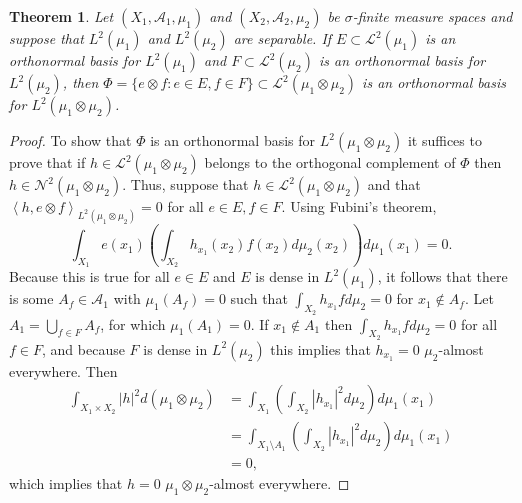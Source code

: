 \documentclass{article}
\newcommand{\inner}[2]{\left\langle #1, #2 \right\rangle}
\newtheorem{theorem}{Theorem}
\theoremstyle{definition}
\begin{document}
\begin{theorem}
Let  $(X_1,\mathscr{A}_1,\mu_1)$ and $(X_2,\mathscr{A}_2,\mu_2)$ be
$\sigma$-finite measure spaces and suppose that
$L^2(\mu_1)$ and $L^2(\mu_2)$ are separable. If
$E \subset \mathscr{L}^2(\mu_1)$ is an orthonormal basis for $L^2(\mu_1)$ and $F \subset \mathscr{L}^2(\mu_2)$ is an orthonormal basis for $L^2(\mu_2)$,
then  $\Phi=\{e \otimes f: e \in E, f \in F\} \subset \mathscr{L}^2(\mu_1 \otimes \mu_2)$ is an orthonormal basis for $L^2(\mu_1 \otimes \mu_2)$. 
\end{theorem}
\begin{proof}
To show that $\Phi$ is an orthonormal basis for $L^2(\mu_1 \otimes \mu_2)$ it suffices to prove that if
$h \in \mathscr{L}^2(\mu_1 \otimes \mu_2)$ belongs to the orthogonal  complement  of $\Phi$ then
$h \in \mathscr{N}^2(\mu_1 \otimes \mu_2)$. 
Thus, suppose that $h \in \mathscr{L}^2(\mu_1 \otimes \mu_2)$ and that 
$\inner{h}{e \otimes f}_{L^2(\mu_1 \otimes \mu_2)}=0$ for all $e \in E, f \in F$. Using Fubini's theorem,
\[
\int_{X_1} e(x_1) \left( \int_{X_2} h_{x_1}(x_2)  f(x_2) d\mu_2(x_2) \right) d\mu_1(x_1)=0.
\]
Because this is true for all $e \in E$ and $E$ is dense in $L^2(\mu_1)$, it follows that there is some
$A_f \in \mathscr{A}_1$ with $\mu_1(A_f)=0$ such that 
$\int_{X_2} h_{x_1} f d\mu_2=0$ for $x_1 \not \in A_f$.  
Let $A_1=\bigcup_{f \in F} A_f$, for which $\mu_1(A_1)=0$. If $x_1 \not \in A_1$ then 
$\int_{X_2} h_{x_1} f d\mu_2=0$ for all $f \in F$, and because $F$ is dense in $L^2(\mu_2)$ this implies that
$h_{x_1}=0$ $\mu_2$-almost everywhere. Then 
\begin{align*}
\int_{X_1 \times X_2} |h|^2 d(\mu_1 \otimes \mu_2) &= 
\int_{X_1} \left( \int_{X_2} |h_{x_1}|^2 d\mu_2 \right) d\mu_1(x_1)\\
&=\int_{X_1 \setminus A_1} \left( \int_{X_2} |h_{x_1}|^2 d\mu_2 \right) d\mu_1(x_1)\\
&=0,
\end{align*}
which implies that $h=0$ $\mu_1 \otimes \mu_2$-almost everywhere.
\end{proof}
\end{document}
